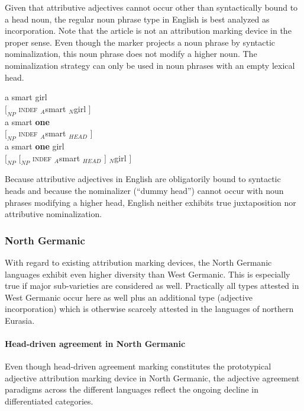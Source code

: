 Given that attributive adjectives cannot occur other than syntactically bound to a head noun, the regular noun phrase type in English is best analyzed as incorporation. Note that the article is not an attribution marking device in the proper sense. Even though the marker projects a noun phrase by syntactic nominalization, this noun phrase does not modify a higher noun. The nominalization strategy can only be used in noun phrases with an empty lexical head.
\begin{exe}
\ex
\begin{xlist}
\ex
\gll	{} a smart girl\\
	$[_{NP}$ \textsc{indef} $_{A}$smart $_{N}$girl $]$\\
\ex
\gll	{} a smart \textbf{one}\\
	$[_{NP}$ \textsc{indef} $_{A}$smart $_{HEAD}$ $]$\\
\ex
\gll	{*} {} {} a smart \textbf{one} {} girl\\
	{} $[_{NP}$ $[_{NP}$ \textsc{indef} $_{A}$smart $_{HEAD}$ $]$ $_{N}$girl $]$\\
\end{xlist}
\end{exe}
Because attributive adjectives in English are obligatorily bound to syntactic heads and because the nominalizer (“dummy head”) cannot occur with noun phrases modifying a higher head, English neither exhibits true juxtaposition nor attributive nominalization.

\subsubsection{North Germanic} \label{n-germanic synchr}
With regard to existing attribution marking devices, the North Germanic languages exhibit even higher diversity than West Germanic. This is especially true if major sub-varieties are considered as well. Practically all types attested in West Germanic occur here as well plus an additional type (adjective incorporation) which is otherwise scarcely attested in the languages of northern Eurasia.

\paragraph{Head-driven agreement in North Germanic} 
Even though head-driven agreement marking constitutes the prototypical adjective attribution marking device in North Germanic, the adjective agreement paradigms across the different languages reflect the ongoing decline in differentiated categories.

